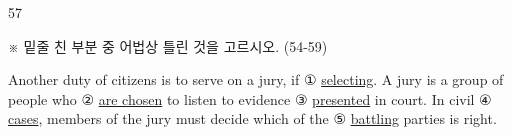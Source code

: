 \begin{question}{57}
\begin{framedtext}
※ 밑줄 친 부분 중 어법상 틀린 것을 고르시오. (54-59) \par
\end{framedtext}
Another duty of citizens is to serve on a jury, if ① \uline{selecting}. A jury is a group of people who ② \uline{are chosen} to listen to evidence ③ \uline{presented} in court. In civil ④ \uline{cases}, members of the jury must decide which of the ⑤ \uline{battling} parties is right.
\end{question}

